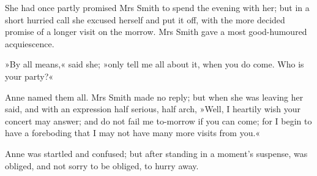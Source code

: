 She had once partly promised Mrs Smith to spend the evening with her; but in a short hurried call she excused herself and put it off, with the more decided promise of a longer visit on the morrow. Mrs Smith gave a most good-humoured acquiescence.

»By all means,« said she; »only tell me all about it, when you do come. Who is your party?«

Anne named them all. Mrs Smith made no reply; but when she was leaving her said, and with an expression half serious, half arch, »Well, I heartily wish your concert may answer; and do not fail me to-morrow if you can come; for I begin to have a foreboding that I may not have many more visits from you.«

Anne was startled and confused; but after standing in a moment's suspense, was obliged, and not sorry to be obliged, to hurry away.